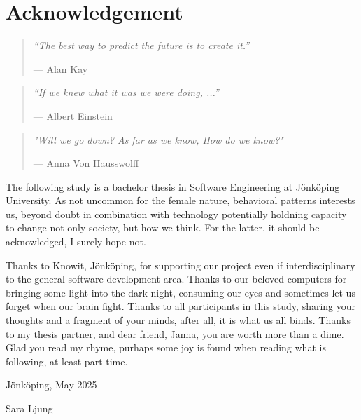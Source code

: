 
\newpage

\chapter*{Acknowledgement}
{}

\begin{center} 
    \begin{minipage}{0.75\textwidth}
        \begin{quote}\itshape
            “The best way to predict the future is to create it.”\par
            \hfill— Alan Kay
          \end{quote}
       \begin{quote}\itshape
            “If we knew what it was we were doing, ...”\par
             \hfill— Albert Einstein
       \end{quote}
          \begin{quote}\itshape 
            "Will we go down? As far as we know,
            How do we know?"\par
            \hfill— Anna Von Hausswolff
          \end{quote}
    \end{minipage}
\end{center}
\vspace{0.5cm}

The following study is a bachelor thesis in Software Engineering at Jönköping University. As not uncommon for the female nature, behavioral 
patterns interests us, beyond doubt in combination with technology potentially holdning capacity to change not only society, but how we think. 
For the latter, it should be acknowledged, I surely hope not. 

\medskip
Thanks to Knowit, Jönköping, for supporting our project even if interdisciplinary to the general software development area. 
Thanks to our beloved computers for bringing some light into the dark night, consuming our eyes and sometimes let us forget when our brain fight. 
Thanks to all participants in this study, sharing your thoughts and a fragment of your minds, after all, it is what us all binds. 
Thanks to my thesis partner, and dear friend, Janna, you are worth more than a dime. 
Glad you read my rhyme, purhaps some joy is found when reading what is following, at least part-time. 

\medskip
Jönköping, May 2025

\medskip
Sara Ljung

\vspace{0.3cm}


